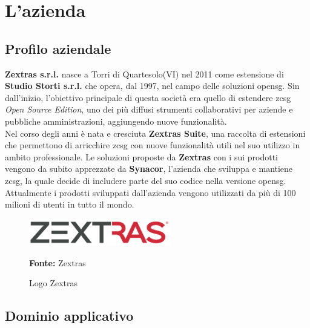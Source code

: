 
\chapter{L'azienda}
\label{cap:azienda}

\section{Profilo aziendale}
    \textbf{Zextras s.r.l.} nasce a Torri di Quartesolo(VI) nel 2011 come estensione di \textbf{Studio Storti s.r.l.} che opera, dal 1997, nel campo delle soluzioni \gls{opensg}. Sin dall'inizio, l'obiettivo principale di questa società era quello di estendere \gls{zcsg} \textit{Open Source Edition}, uno dei più diffusi strumenti collaborativi per aziende e pubbliche amministrazioni, aggiungendo nuove funzionalità. \\
    Nel corso degli anni è nata e cresciuta \textbf{Zextras Suite}, una raccolta di estensioni che permettono di arricchire \gls{zcsg} con nuove funzionalità utili nel suo utilizzo in ambito professionale.
    Le soluzioni proposte da \textbf{Zextras} con i sui prodotti vengono da subito apprezzate da \textbf{Synacor}, l'azienda che sviluppa e mantiene \gls{zcsg}, la quale decide di includere parte del suo codice nella versione \gls{opensg}. Attualmente i prodotti sviluppati dall'azienda vengono utilizzati da più di 100 milioni di utenti in tutto il mondo.

    \begin{figure}[h]
        \centering
        \includegraphics[width=0.55\textwidth]{immagini/zextras_logo.png}
        \caption{Logo Zextras}
        \textbf{Fonte:} Zextras
        \label{fig: Logo Zextras}
    \end{figure}

\section{Dominio applicativo}
